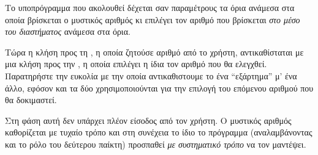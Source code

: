 \documentclass[a4paper,11pt,oneside]{book}
\begin{document}

Το υποπρόγραμμα που ακολουθεί δέχεται σαν παραμέτρους τα όρια ανάμεσα στα οποία βρίσκεται ο μυστικός αριθμός κι επιλέγει τον αριθμό που βρίσκεται \emph{στο μέσο του διαστήματος} ανάμεσα στα όρια. 


Τώρα η κλήση προς τη , η οποία ζητούσε αριθμό από το χρήστη, αντικαθίσταται με μια κλήση προς την , η οποία επιλέγει η ίδια τον αριθμό που θα ελεγχθεί. Παρατηρήστε την ευκολία με την οποία αντικαθιστουμε το ένα ``εξάρτημα'' μ' ένα άλλο, εφόσον και τα δύο χρησιμοποιούνται για την επιλογή του επόμενου αριθμού που θα δοκιμαστεί.


Στη φάση αυτή δεν υπάρχει πλέον είσοδος από τον χρήστη. Ο μυστικός αριθμός καθορίζεται με τυχαίο τρόπο και στη συνέχεια το ίδιο το πρόγραμμα (αναλαμβάνοντας και το ρόλο του δεύτερου παίκτη) προσπαθεί \emph{με συστηματικό τρόπο} να τον μαντέψει.
\end{document}
